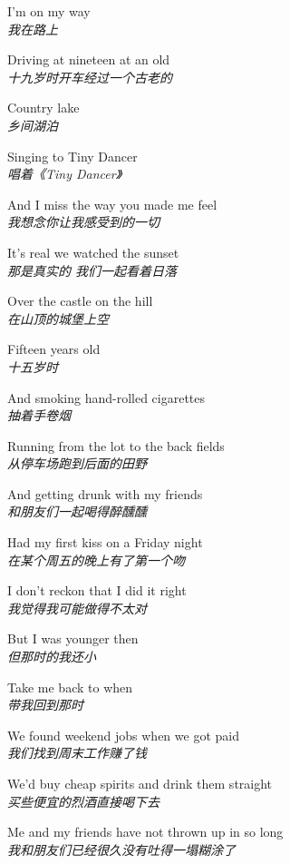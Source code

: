 \begin{spacing}{1.5}
\begin{flushleft}
I'm on my way\\
\textit{我在路上}\lyricspace

Driving at nineteen at an old\\
\textit{十九岁时开车经过一个古老的}\lyricspace

Country lake\\
\textit{乡间湖泊}\lyricspace

Singing to Tiny Dancer\\
\textit{唱着《Tiny Dancer》}\lyricspace

And I miss the way you made me feel\\
\textit{我想念你让我感受到的一切}\lyricspace

It's real we watched the sunset\\
\textit{那是真实的 我们一起看着日落}\lyricspace

Over the castle on the hill\\
\textit{在山顶的城堡上空}\lyricspace

Fifteen years old\\
\textit{十五岁时}\lyricspace

And smoking hand-rolled cigarettes\\
\textit{抽着手卷烟}\lyricspace

Running from the lot to the back fields\\
\textit{从停车场跑到后面的田野}\lyricspace

And getting drunk with my friends\\
\textit{和朋友们一起喝得醉醺醺}\lyricspace

Had my first kiss on a Friday night\\
\textit{在某个周五的晚上有了第一个吻}\lyricspace

I don't reckon that I did it right\\
\textit{我觉得我可能做得不太对}\lyricspace

But I was younger then\\
\textit{但那时的我还小}\lyricspace

Take me back to when\\
\textit{带我回到那时}\lyricspace

We found weekend jobs when we got paid\\
\textit{我们找到周末工作赚了钱}\lyricspace

We'd buy cheap spirits and drink them straight\\
\textit{买些便宜的烈酒直接喝下去}\lyricspace

Me and my friends have not thrown up in so long\\
\textit{我和朋友们已经很久没有吐得一塌糊涂了}\lyricspace


\end{flushleft}
\end{spacing}
